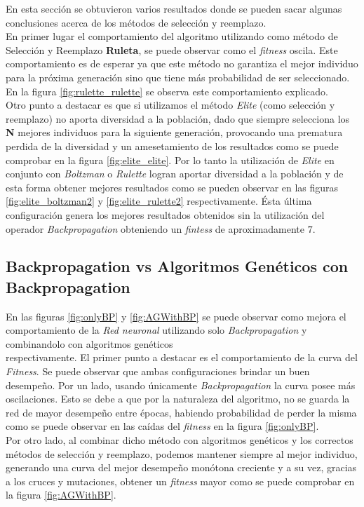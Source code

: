 \documentclass{sig-alternate}
\begin{document}
		En esta sección se obtuvieron varios resultados donde se pueden sacar algunas conclusiones acerca de los métodos de selección y reemplazo.\\
		En primer lugar el comportamiento del algoritmo utilizando como método de Selección y Reemplazo \textbf{Ruleta}, se puede observar como el \textit{fitness} oscila. Este comportamiento es de esperar ya que este método no garantiza el mejor individuo para la próxima generación sino que tiene más probabilidad de ser seleccionado. En la figura \ref{fig:rulette_rulette} se observa este comportamiento explicado.\\
		Otro punto a destacar es que si utilizamos el método \textit{Elite} (como selección y reemplazo) no aporta diversidad a la población, dado que siempre selecciona los \textbf{N} mejores individuos para la siguiente generación, provocando una prematura perdida de la diversidad y un amesetamiento de los resultados como se puede comprobar en la figura \ref{fig:elite_elite}. Por lo tanto la utilización de \textit{Elite} en conjunto con \textit{Boltzman} o \textit{Rulette} logran aportar diversidad a la población y de esta forma obtener mejores resultados como se pueden observar en las figuras \ref{fig:elite_boltzman2} y \ref{fig:elite_rulette2} respectivamente. Ésta última configuración genera los mejores resultados obtenidos sin la utilización del operador \textit{Backpropagation} obteniendo un \textit{fintess} de aproximadamente $7$.

		\subsection{Backpropagation vs Algoritmos Genéticos con Backpropagation}

		En las figuras \ref{fig:onlyBP} y \ref{fig:AGWithBP} se puede observar como mejora el comportamiento de la \textit{Red neuronal} utilizando solo \textit{Backpropagation} y combinandolo con algoritmos genéticos  \\  respectivamente.
		El primer punto a destacar es el comportamiento de la curva del \textit{Fitness}.
		Se puede observar que ambas configuraciones brindar un buen desempeño. Por un lado, usando únicamente \textit{Backpropagation} la curva posee más oscilaciones. Esto se debe a que por la naturaleza del algoritmo, no se guarda la red de mayor desempeño entre épocas, habiendo probabilidad de perder la misma como se puede observar en las caídas del \textit{fitness} en la figura  \ref{fig:onlyBP}.\\
		Por otro lado, al combinar dicho método con algoritmos genéticos y los correctos métodos de selección y reemplazo, podemos mantener siempre al mejor individuo, generando una curva del mejor desempeño monótona creciente y a su vez, gracias a los cruces y mutaciones, obtener un \textit{fitness} mayor como se puede comprobar en la figura   \ref{fig:AGWithBP}.
		
\end{document}
